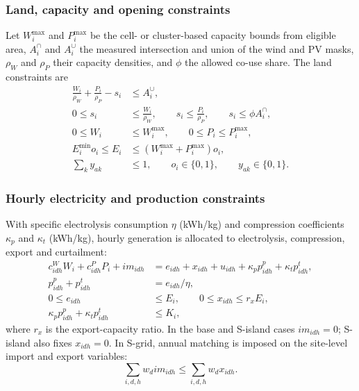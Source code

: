 \documentclass[11pt,a4paper]{article}
\begin{document}
\subsubsection{Land, capacity and opening constraints}
Let $W_i^{\max}$ and $P_i^{\max}$ be the cell- or cluster-based capacity bounds
from eligible area, $A_i^{\cap}$ and $A_i^{\cup}$ the measured intersection
and union of the wind and PV masks, $\rho_W$ and $\rho_P$ their capacity
densities, and $\phi$ the allowed co-use share. The land constraints are
\begin{equation}
\begin{aligned}
\frac{W_i}{\rho_W}+\frac{P_i}{\rho_P}-s_i &\le A_i^{\cup},\\
0\le s_i &\le \frac{W_i}{\rho_W},\qquad
s_i\le \frac{P_i}{\rho_P},\qquad s_i\le \phi A_i^{\cap},\\
0\le W_i &\le W_i^{\max},\qquad 0\le P_i\le P_i^{\max},\\
E_i^{\min}o_i\le E_i &\le (W_i^{\max}+P_i^{\max})o_i,\\
\textstyle\sum_{k}y_{ak}&\le 1,\qquad o_i\in\{0,1\},\qquad y_{ak}\in\{0,1\}.
\end{aligned}
\label{eq:s5_land_open}
\end{equation}

\subsubsection{Hourly electricity and production constraints}
With specific electrolysis consumption $\eta$ (kWh/kg) and compression
coefficients $\kappa_p$ and $\kappa_t$ (kWh/kg), hourly generation is allocated
to electrolysis, compression, export and curtailment:
\begin{equation}
\begin{aligned}
c^W_{idh}W_i+c^P_{idh}P_i+im_{idh}
 &= e_{idh}+x_{idh}+u_{idh}+\kappa_p p^p_{idh}+\kappa_t p^t_{idh},\\
p^p_{idh}+p^t_{idh} &= e_{idh}/\eta,\\
0\le e_{idh} &\le E_i,\qquad 0\le x_{idh}\le r_xE_i,\\
\kappa_p p^p_{idh}+\kappa_t p^t_{idh} &\le K_i,
\end{aligned}
\label{eq:s5_electricity}
\end{equation}
where $r_x$ is the export-capacity ratio. In the base and S-island cases
$im_{idh}=0$; S-island also fixes $x_{idh}=0$. In S-grid, annual matching is
imposed on the site-level import and export variables:
\begin{equation}
\sum_{i,d,h}w_d im_{idh}\le \sum_{i,d,h}w_d x_{idh}.
\label{eq:s5_matching}
\end{equation}
\end{document}
